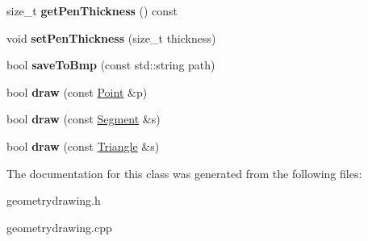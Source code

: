 \begin{DoxyCompactItemize}
\item 
\hypertarget{class_geometry_drawing_a36539afa544954f4984c29636e64c29a}{}\label{class_geometry_drawing_a36539afa544954f4984c29636e64c29a} 
size\+\_\+t {\bfseries get\+Pen\+Thickness} () const
\item 
\hypertarget{class_geometry_drawing_afdec924bd197ef3f9da24a3b6e1d3919}{}\label{class_geometry_drawing_afdec924bd197ef3f9da24a3b6e1d3919} 
void {\bfseries set\+Pen\+Thickness} (size\+\_\+t thickness)
\item 
\hypertarget{class_geometry_drawing_ac0ab05d31ad0ad4a6ede5bc7b6216eff}{}\label{class_geometry_drawing_ac0ab05d31ad0ad4a6ede5bc7b6216eff} 
bool {\bfseries save\+To\+Bmp} (const std\+::string path)
\item 
\hypertarget{class_geometry_drawing_a5f078433a80de7631697f59ec08110f2}{}\label{class_geometry_drawing_a5f078433a80de7631697f59ec08110f2} 
bool {\bfseries draw} (const \hyperlink{class_point}{Point} \&p)
\item 
\hypertarget{class_geometry_drawing_ab718587f0127ab8638d6b426f895665a}{}\label{class_geometry_drawing_ab718587f0127ab8638d6b426f895665a} 
bool {\bfseries draw} (const \hyperlink{class_segment}{Segment} \&s)
\item 
\hypertarget{class_geometry_drawing_ad27cd30c307f345bf51234a0cab652fb}{}\label{class_geometry_drawing_ad27cd30c307f345bf51234a0cab652fb} 
bool {\bfseries draw} (const \hyperlink{class_triangle}{Triangle} \&s)
\end{DoxyCompactItemize}


The documentation for this class was generated from the following files\+:\begin{DoxyCompactItemize}
\item 
geometrydrawing.\+h\item 
geometrydrawing.\+cpp\end{DoxyCompactItemize}
